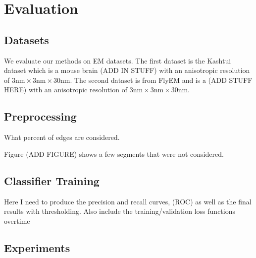 \section{Evaluation}

\subsection{Datasets}

We evaluate our methods on EM datasets. The first dataset is the Kashtui dataset  which is a mouse brain (ADD IN STUFF) with an anisotropic resolution of $3\textrm{nm} \times 3 \textrm{nm} \times 30 \textrm{nm}$. The second dataset is from FlyEM and is a (ADD STUFF HERE) with an anisotropic resolution of $3 \textrm{nm} \times 3\textrm{nm} \times 30\textrm{nm}$. 


\subsection{Preprocessing}

What percent of edges are considered.

Figure (ADD FIGURE) shows a few segments that were not considered. 

\subsection{Classifier Training}

Here I need to produce the precision and recall curves, (ROC) as well as the final results with thresholding. Also include the training/validation loss functions overtime

\subsection{Experiments}
